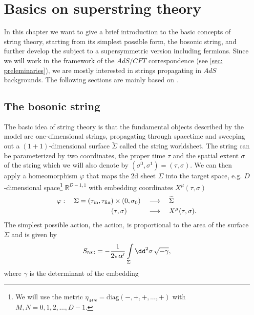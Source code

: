 \chapter{Basics on superstring theory}\label{ch: string_basics}
In this chapter we want to give a brief introduction to the basic concepts of string theory, starting from its simplest possible form, the bosonic string, and further develop the subject to a supersymmetric version including fermions. Since we will work in the framework of the $AdS/CFT$ correspondence (see \autoref{sec: preleminaries}), we are mostly interested in strings propagating in $AdS$ backgrounds. The following sections are mainly based on \cite{Polchinski:1998rq,Polchinski:1998rr,Ammon:2015wua,Becker:2007zj}.
%
%
%
%
%
%
%
\section{The bosonic string}
The basic idea of string theory is that the fundamental objects described by the model are one-dimensional strings, propagating through spacetime and sweeping out a $(1+1)$-dimensional surface $\widetilde{\Sigma}$ called the string worldsheet. The string can be parameterized by two coordinates, the proper time $\tau$ and the spatial extent $\sigma$ of the string which we will also denote by $(\sigma^{0},\sigma^{1})=(\tau,\sigma)$. We can then apply a homeomorphism $\varphi$ that maps the 2d sheet $\Sigma$ into the target space, e.g. $D$-dimensional  space\footnote{We will use the metric $\eta_{MN}=\text{diag}(-,+,+,\ldots,+)$ with $M,N=0,1,2,\ldots,D-1.$} $\mathbb{R}^{D-1,1}$ with embedding coordinates $X^{\mu}(\tau,\sigma)$
%
%
\begin{equation}
\begin{alignedat}{3}
\varphi :\quad  \Sigma = (\tau_{\rm in},\tau_{\rm fin}) \times (0,\sigma_{0}) \quad &\longrightarrow \quad \widetilde{\Sigma} \\
(\tau,\sigma) \qquad\quad &\longrightarrow \quad X^{\mu}(\tau,\sigma).
\end{alignedat}
\end{equation}
%
%
The simplest possible action, the  action, is proportional to the area of the surface $\widetilde{\Sigma}$ and is given by
%
%
\begin{equation}
S_{\rm NG} = -\frac{1}{2\pi\alpha'} \int\limits_{\Sigma} \dd^{2}\sigma \, \sqrt{-\gamma},
\end{equation}
%
%
where $\gamma$ is the  determinant of the embedding
